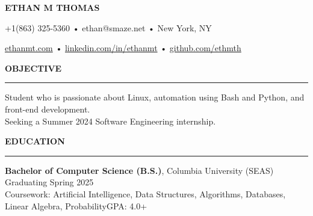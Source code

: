 \documentclass[10pt,letterpaper]{article}
\begin{document}
\begingroup
\centerline{\MakeUppercase{\LARGE\bf Ethan M Thomas}} \medskip
\endgroup

\begingroup
\centerline{+1(863) 325-5360 • ethan@smaze.net • New York, NY}
\endgroup
\par

\begingroup
\centerline{\href{www.ethanmt.com}{ethanmt.com} • \href{https://www.linkedin.com/in/ethanmt/}{linkedin.com/in/ethanmt} • \href{https://github.com/ethmth}{github.com/ethmth}}
\endgroup
\par


\medskip
\MakeUppercase{{\bf Objective}} %
\medskip
\hrule %
\begin{list}{}{\setlength{\leftmargin}{0em}}
    \item
          {Student who is passionate about Linux, automation using Bash and Python, and front-end development.
          \\ Seeking a Summer 2024 Software Engineering internship.}
\end{list}



\medskip
\MakeUppercase{{\bf Education}}
\medskip
\hrule
\begin{list}{}{\setlength{\leftmargin}{0em}}
    \item
          {\bf Bachelor of Computer Science (B.S.)}, Columbia University (SEAS) \hfill  {Graduating Spring 2025}\\
          Coursework: Artificial Intelligence, Data Structures, Algorithms, Databases, Linear Algebra, Probability\hfill {GPA: 4.0+}
\end{list}
\end{document}
